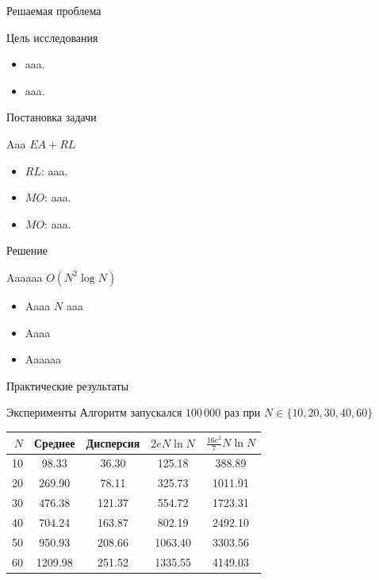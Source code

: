 \documentclass{beamer}
\begin{document}
\begin{frame}{Решаемая проблема}
\begin{block}{Цель исследования}
\begin{itemize}
\item aaa.
\item aaa.
\end{itemize}
\end{block}
\end{frame}

\begin{frame}{Постановка задачи}
\begin{block}{Aaa $EA + RL$}
\begin{center}
\end{center}
\begin{itemize}
\item $RL$: aaa.
\item $MO$: aaa.
\item $MO$: aaa.
\end{itemize}
\end{block}
\end{frame}

\begin{frame}{Решение}
\begin{block}{Aaaaaa $O(N^2 \log N)$}
\begin{itemize}
\item Aaaa $N$ aaa
\item Aaaa
\item Aaaaaa
\end{itemize}
\end{block}
\end{frame}

\begin{frame}{Практические результаты}
\begin{block}{Эксперименты}
Алгоритм запускался $100\,000$ раз при $N \in \{10, 20, 30, 40, 60\}$
\begin{table}[h]
\begin{center}
\begin{tabular}{r|c|c|c|c}
$N$ & Среднее & Дисперсия & $2eN \ln N$ & $\frac{16e^2}{7}N \ln N$ \\\hline
10 & 98.33 & 36.30 & 125.18 & 388.89 \\
20 & 269.90 & 78.11 & 325.73 & 1011.91 \\
30 & 476.38 & 121.37 & 554.72 & 1723.31 \\
40 & 704.24 & 163.87 & 802.19 & 2492.10 \\
50 & 950.93 & 208.66 & 1063.40 & 3303.56 \\
60 & 1209.98 & 251.52 & 1335.55 & 4149.03
\end{tabular}
\end{center}
\end{table}
\end{block}
\end{frame}
\end{document}
